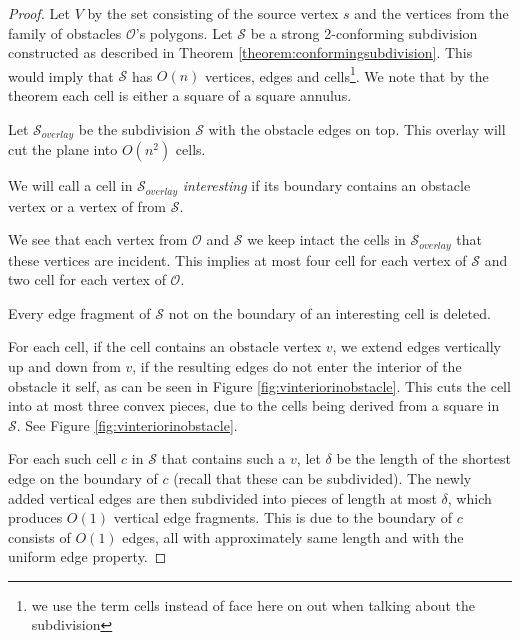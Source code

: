 \begin{proof}
Let $V$ by the set consisting of the source vertex $s$ and the vertices from the family of 
obstacles $\mathcal{O}$'s polygons. Let $\mathcal{S}$ be a strong 2-conforming subdivision 
constructed as described in Theorem \ref{theorem:conformingsubdivision}. This would imply 
that $\mathcal{S}$ has $O(n)$ vertices, edges and cells\footnote{we use the term cells 
instead of face here on out when talking about the subdivision}. We note that by the 
theorem each cell is either a square of a square annulus. 

Let $\mathcal{S}_{overlay}$ be the subdivision $\mathcal{S}$ with the obstacle edges on 
top. This overlay will cut the plane into $O(n^2)$ cells. 

We will call a cell in $\mathcal{S}_{overlay}$ \textit{interesting} if its boundary 
contains an obstacle vertex or a vertex of from $\mathcal{S}$. 

We see that each vertex from $\mathcal{O}$ and $\mathcal{S}$ we keep intact the cells in 
$\mathcal{S}_{overlay}$ that these vertices are incident. This implies at most four cell 
for each vertex of $\mathcal{S}$ and two cell for each vertex of $\mathcal{O}$. 

Every edge fragment of $\mathcal{S}$ not on the boundary of an interesting cell is 
deleted.

For each cell, if the cell contains an obstacle vertex $v$, we extend edges vertically up 
and down from $v$, if the resulting edges do not enter the interior of the obstacle it 
self, as can be seen in Figure \ref{fig:vinteriorinobstacle}. This cuts the cell into at 
most three convex pieces, due to the cells being derived from a square in $\mathcal{S}$. 
See Figure \ref{fig:vinteriorinobstacle}. 



For each such cell $c$ in $\mathcal{S}$ that contains such a $v$, let $\delta$ be the 
length of the shortest edge on the boundary of $c$ (recall that these can be subdivided). 
The newly added vertical edges are then subdivided into pieces of length at most $\delta$, 
which produces $O(1)$ vertical edge fragments. This is due to the boundary of $c$ consists 
of $O(1)$ edges, all with approximately same length and with the uniform edge property. 


\end{proof}

